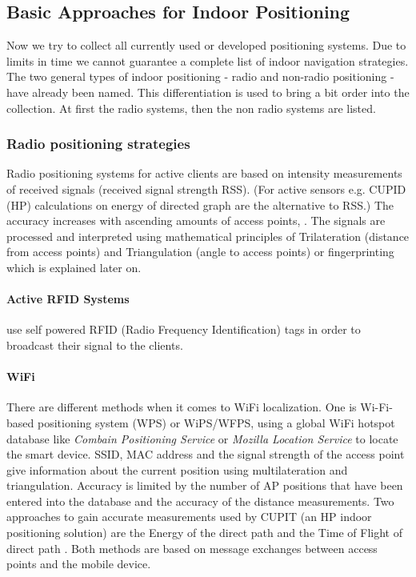 \subsection{Basic Approaches for Indoor Positioning}

Now we try to collect all currently used or developed positioning systems. Due to limits in time we cannot guarantee a complete list of indoor navigation strategies. The two general types of indoor positioning - radio and non-radio positioning - have already been named. This differentiation is used to bring a bit order into the collection. At first the radio systems, then the non radio systems are listed. 


\subsubsection{Radio positioning strategies}

Radio positioning systems for active clients are based on intensity measurements of received signals (received signal strength RSS). (For active sensors e.g. CUPID (HP) calculations on energy of directed graph are the alternative to RSS.) The accuracy increases with ascending amounts of access points, \parencite{indoorGeolocation}.
The signals are processed and interpreted using mathematical principles of Trilateration (distance from access points) and Triangulation (angle to access points) \parencite{measurement} or fingerprinting which is explained later on. 

\paragraph{Active RFID Systems} use self powered RFID (Radio Frequency Identification) tags in order to broadcast their signal to the clients. 

\paragraph{WiFi} There are different methods when it comes to WiFi localization. One is Wi-Fi-based positioning system (WPS) or WiPS/WFPS, using a global WiFi hotspot database like \textit{Combain Positioning Service} or \textit{Mozilla Location Service} to locate the smart device. SSID, MAC address and the signal strength of the access point give information about the current position using  multilateration and triangulation. Accuracy is limited by the number of AP positions that have been entered into the database and the accuracy of the distance measurements. 
Two approaches to gain accurate measurements used by CUPIT (an HP indoor positioning solution) are the Energy of the direct path and the Time of Flight of direct path \parencite{sail}. Both methods are based on message exchanges between access points and the mobile device. 

